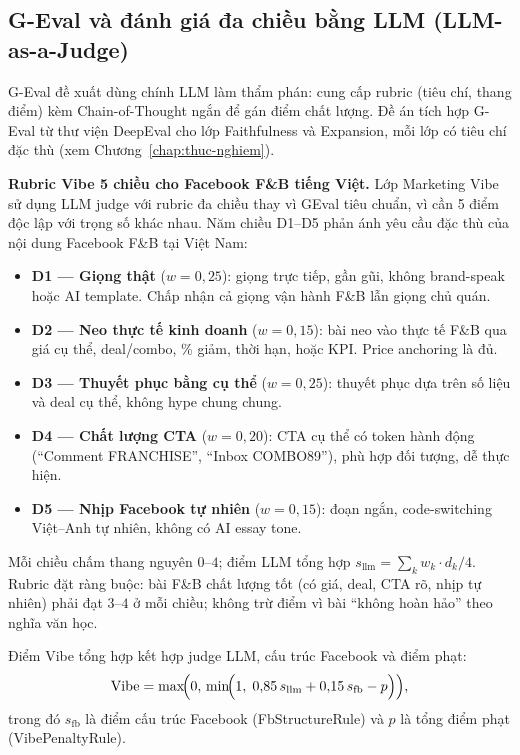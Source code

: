 \subsection{G-Eval và đánh giá đa chiều bằng LLM (LLM-as-a-Judge)}

G-Eval đề xuất dùng chính LLM làm thẩm phán: cung cấp
rubric (tiêu chí, thang điểm) kèm Chain-of-Thought ngắn
để gán điểm chất lượng. Đề án tích hợp G-Eval từ thư
viện DeepEval cho lớp Faithfulness và Expansion, mỗi lớp
có tiêu chí đặc thù (xem Chương~\ref{chap:thuc-nghiem}).

\textbf{Rubric Vibe 5 chiều cho Facebook F\&B tiếng Việt.}
Lớp Marketing Vibe sử dụng LLM judge với rubric đa chiều
thay vì GEval tiêu chuẩn, vì cần 5 điểm độc lập với
trọng số khác nhau. Năm chiều D1--D5 phản ánh yêu cầu
đặc thù của nội dung Facebook F\&B tại Việt Nam:

\begin{itemize}
  \item \textbf{D1 --- Giọng thật} ($w = 0{,}25$): giọng
    trực tiếp, gần gũi, không brand-speak hoặc AI
    template. Chấp nhận cả giọng vận hành F\&B lẫn
    giọng chủ quán.
  \item \textbf{D2 --- Neo thực tế kinh doanh} ($w =
    0{,}15$): bài neo vào thực tế F\&B qua giá cụ thể,
    deal/combo, \% giảm, thời hạn, hoặc KPI. Price
    anchoring là đủ.
  \item \textbf{D3 --- Thuyết phục bằng cụ thể} ($w =
    0{,}25$): thuyết phục dựa trên số liệu và deal cụ
    thể, không hype chung chung.
  \item \textbf{D4 --- Chất lượng CTA} ($w = 0{,}20$):
    CTA cụ thể có token hành động (``Comment FRANCHISE'',
    ``Inbox COMBO89''), phù hợp đối tượng, dễ thực hiện.
  \item \textbf{D5 --- Nhịp Facebook tự nhiên} ($w =
    0{,}15$): đoạn ngắn, code-switching Việt--Anh tự
    nhiên, không có AI essay tone.
\end{itemize}

Mỗi chiều chấm thang nguyên $0$--$4$; điểm LLM tổng
hợp $s_{\text{llm}} = \sum_{k} w_k \cdot d_k / 4$.
Rubric đặt ràng buộc: bài F\&B chất lượng tốt (có giá,
deal, CTA rõ, nhịp tự nhiên) phải đạt $3$--$4$ ở mỗi
chiều; không trừ điểm vì bài ``không hoàn hảo'' theo
nghĩa văn học.

Điểm Vibe tổng hợp kết hợp judge LLM, cấu trúc
Facebook và điểm phạt:
\begin{equation}
  \text{Vibe} = \max\!\Bigl(0,\,\min\!\Bigl(1,\;
  0{,}85\,s_{\text{llm}} + 0{,}15\,s_{\text{fb}}
  - p\Bigr)\Bigr),
  \label{eq:vibe-theory}
\end{equation}
trong đó $s_{\text{fb}}$ là điểm cấu trúc Facebook
(FbStructureRule) và $p$ là tổng điểm phạt
(VibePenaltyRule).

